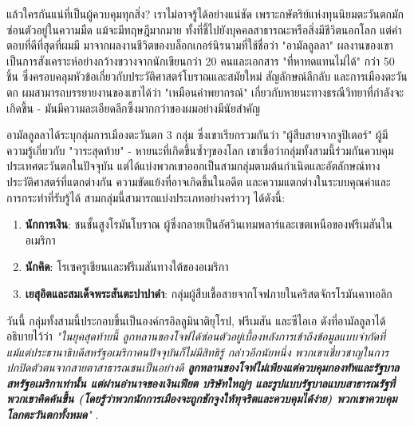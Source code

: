 \documentclass[10pt,twocolumn,letterpaper]{article}
\begin{document}
แล้วใครกันแน่ที่เป็นผู้ควบคุมทุกสิ่ง? เราไม่อาจรู้ได้อย่างแน่ชัด เพราะกษัตริย์แห่งทุนนิยมตะวันตกมักซ่อนตัวอยู่ในความมืด แม้จะมีทฤษฎีมากมาย ทั้งที่ชี้ไปยังบุคคลสาธารณะหรือสิ่งมีชีวิตนอกโลก แต่คำตอบที่ดีที่สุดที่ผมมี มาจากผลงานชีวิตของบล็อกเกอร์นิรนามที่ใช้ชื่อว่า "อามัลลูลลา" ผลงานของเขาเป็นการสังเคราะห์อย่างกว้างขวางจากนักเขียนกว่า 20 คนและเอกสาร "ที่หาทดแทนไม่ได้" กว่า 50 ชิ้น ซึ่งครอบคลุมหัวข้อเกี่ยวกับประวัติศาสตร์โบราณและสมัยใหม่ สัญลักษณ์ลึกลับ และการเมืองตะวันตก \cite{33,34} ผมสามารถบรรยายงานของเขาได้ว่า "เหมือนคำพยากรณ์" เกี่ยวกับหายนะทางธรณีวิทยาที่กำลังจะเกิดขึ้น - มันมีความละเอียดลึกซึ้งมากกว่าของผมอย่างมีนัยสำคัญ

อามัลลูลลาได้ระบุกลุ่มการเมืองตะวันตก 3 กลุ่ม ซึ่งเขาเรียกรวมกันว่า "ผู้สืบสายจากจูปิเตอร์" ผู้มีความรู้เกี่ยวกับ "วาระสุดท้าย" - หายนะที่เกิดขึ้นซ้ำๆของโลก เขาเชื่อว่ากลุ่มทั้งสามนี้ร่วมกันควบคุมประเทศตะวันตกในปัจจุบัน แต่ได้แบ่งพวกเขาออกเป็นสามกลุ่มตามต้นกำเนิดและอัตลักษณ์ทางประวัติศาสตร์ที่แตกต่างกัน ความขัดแย้งที่อาจเกิดขึ้นในอดีต และความแตกต่างในระบบคุณค่าและการกระทำที่รับรู้ได้
สามกลุ่มนี้สามารถแบ่งประเภทอย่างคร่าวๆ ได้ดังนี้:

\begin{flushleft}
\begin{enumerate}
    \item \textbf{นักการเงิน}: ชนชั้นสูงโรมันโบราณ ผู้ซึ่งกลายเป็นอัศวินเทมพลาร์และเขตเหนือของฟรีเมสันในอเมริกา
    \item \textbf{นักคิด}: โรเซครูเชียนและฟรีเมสันทางใต้ของอเมริกา
    \item \textbf{เยสุอิตและสมเด็จพระสันตะปาปาดำ}: กลุ่มผู้สืบเชื้อสายจากโจฟภายในคริสตจักรโรมันคาทอลิก
\end{enumerate}
\end{flushleft}
วันนี้ กลุ่มทั้งสามนี้ประกอบขึ้นเป็นองค์กรอิลลูมินาติยุโรป, ฟรีเมสัน และซีไอเอ ดังที่อามัลลูลาได้อธิบายไว้ว่า \textit{"ในยุคสุดท้ายนี้ ลูกหลานของโจฟได้ซ่อนตัวอยู่เบื้องหลังการเข้าถึงข้อมูลแบบจำกัดที่แม้แต่ประธานาธิบดีสหรัฐอเมริกาคนปัจจุบันก็ไม่มีสิทธิรู้ กล่าวอีกนัยหนึ่ง พวกเขาเชี่ยวชาญในการปกปิดตัวตนจากสายตาสาธารณชนเป็นอย่างดี \textbf{ลูกหลานของโจฟไม่เพียงแต่ควบคุมกองทัพและรัฐบาลสหรัฐอเมริกาเท่านั้น แต่ผ่านอำนาจของเงินเฟียต บริษัทใหญ่ๆ และรูปแบบรัฐบาลแบบสาธารณรัฐที่พวกเขาคิดค้นขึ้น (โดยรู้ว่าพวกนักการเมืองจะถูกชักจูงให้ทุจริตและควบคุมได้ง่าย) พวกเขาควบคุมโลกตะวันตกทั้งหมด}"} \cite{33,34}.
\end{document}

